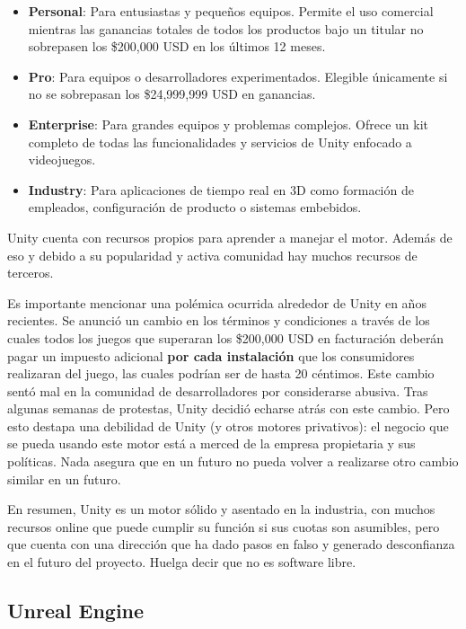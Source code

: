 \begin{itemize}
    \item \textbf{Personal}: Para entusiastas y pequeños equipos. Permite el uso comercial mientras las ganancias totales de todos los productos bajo un titular no sobrepasen los \$200,000 USD en los últimos 12 meses.
    \item \textbf{Pro}: Para equipos o desarrolladores experimentados. Elegible únicamente si no se sobrepasan los \$24,999,999 USD en ganancias.
    \item \textbf{Enterprise}: Para grandes equipos y problemas complejos. Ofrece un kit completo de todas las funcionalidades y servicios de Unity enfocado a videojuegos.
    \item \textbf{Industry}: Para aplicaciones de tiempo real en 3D como formación de empleados, configuración de producto o sistemas embebidos.
\end{itemize}

Unity cuenta con recursos propios para aprender a manejar el motor. Además de eso y debido a su popularidad y activa comunidad hay muchos recursos de terceros.

Es importante mencionar una polémica \cite{unicty-scandal} ocurrida alrededor de Unity en años recientes. Se anunció un cambio en los términos y condiciones a través de los cuales todos los juegos que superaran los \$200,000 USD en facturación deberán pagar un impuesto adicional \textbf{por cada instalación} que los consumidores realizaran del juego, las cuales podrían ser de hasta 20 céntimos. Este cambio sentó mal en la comunidad de desarrolladores por considerarse abusiva. Tras algunas semanas de protestas, Unity decidió echarse atrás con este cambio. Pero esto destapa una debilidad de Unity (y otros motores privativos): el negocio que se pueda usando este motor está a merced de la empresa propietaria y sus políticas. Nada asegura que en un futuro no pueda volver a realizarse otro cambio similar en un futuro.

En resumen, Unity es un motor sólido y asentado en la industria, con muchos recursos online que puede cumplir su función si sus cuotas son asumibles, pero que cuenta con una dirección que ha dado pasos en falso y generado desconfianza en el futuro del proyecto. Huelga decir que no es software libre.

\subsection{Unreal Engine}

